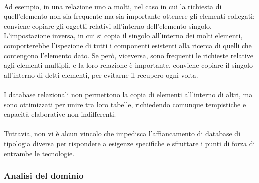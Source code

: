 \\
Ad esempio, in una relazione uno a molti, nel caso in cui la richiesta di quell’elemento non sia frequente ma sia importante ottenere gli elementi collegati; 
conviene copiare gli oggetti relativi all’interno dell’elemento singolo. 
L’impostazione inversa, in cui si copia il singolo all’interno dei molti elementi, 
comporterebbe l’ispezione di tutti i componenti esistenti alla ricerca di quelli che contengono l’elemento dato. 
Se però, viceversa, sono frequenti le richieste relative agli elementi multipli, e la loro relazione è importante, 
conviene copiare il singolo all'interno di detti elementi, per evitarne il recupero ogni volta.\\
\\
I database relazionali non permettono la copia di elementi all’interno di altri, ma sono ottimizzati per unire tra loro tabelle, 
richiedendo comunque tempistiche e capacità elaborative non indifferenti. \\
\\
Tuttavia, non vi è alcun vincolo che impedisca l’affiancamento di database di tipologia diversa per rispondere a esigenze specifiche e sfruttare i punti di forza di entrambe le tecnologie.

\subsubsection{ Analisi del dominio}

